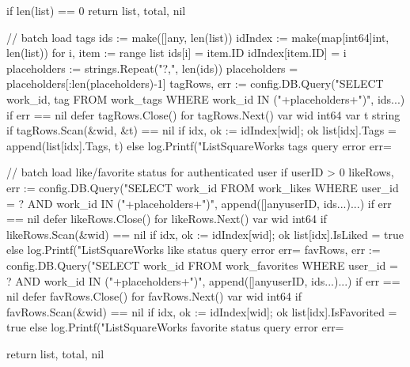 \documentclass[twoside]{thesis-cls-Miya} %
\begin{document}
{	if len(list) == 0 {
		return list, total, nil
	}

	// batch load tags
	ids := make([]any, len(list))
	idIndex := make(map[int64]int, len(list))
	for i, item := range list {
		ids[i] = item.ID
		idIndex[item.ID] = i
	}
	placeholders := strings.Repeat("?,", len(ids))
	placeholders = placeholders[:len(placeholders)-1]
	tagRows, err := config.DB.Query("SELECT work_id, tag FROM work_tags WHERE work_id IN ("+placeholders+")", ids...)
	if err == nil {
		defer tagRows.Close()
		for tagRows.Next() {
			var wid int64
			var t string
			if tagRows.Scan(&wid, &t) == nil {
				if idx, ok := idIndex[wid]; ok {
					list[idx].Tags = append(list[idx].Tags, t)
				}
			}
		}
	} else {
		log.Printf("ListSquareWorks tags query error err=%
	}

	// batch load like/favorite status for authenticated user
	if userID > 0 {
		likeRows, err := config.DB.Query("SELECT work_id FROM work_likes WHERE user_id = ? AND work_id IN ("+placeholders+")", append([]any{userID}, ids...)...)
		if err == nil {
			defer likeRows.Close()
			for likeRows.Next() {
				var wid int64
				if likeRows.Scan(&wid) == nil {
					if idx, ok := idIndex[wid]; ok {
						list[idx].IsLiked = true
					}
				}
			}
		} else {
			log.Printf("ListSquareWorks like status query error err=%
		}
		favRows, err := config.DB.Query("SELECT work_id FROM work_favorites WHERE user_id = ? AND work_id IN ("+placeholders+")", append([]any{userID}, ids...)...)
		if err == nil {
			defer favRows.Close()
			for favRows.Next() {
				var wid int64
				if favRows.Scan(&wid) == nil {
					if idx, ok := idIndex[wid]; ok {
						list[idx].IsFavorited = true
					}
				}
			}
		} else {
			log.Printf("ListSquareWorks favorite status query error err=%
		}
	}

	return list, total, nil
}
\end{document}
